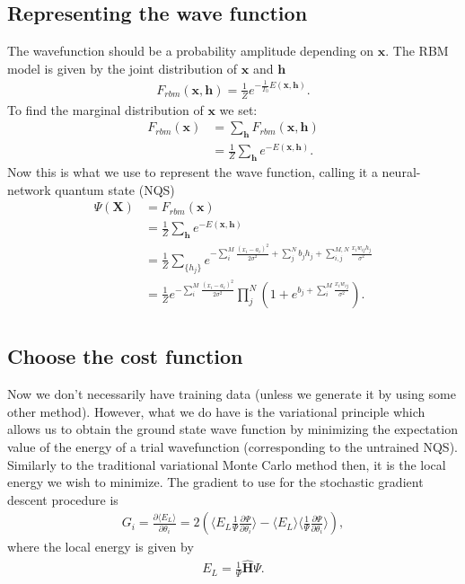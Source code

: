 \documentclass[%
oneside,                 %
final,                   %
10pt]{article}
\begin{document}
\subsection{Representing the wave function}
The wavefunction should be a probability amplitude depending on $\bm{x}$. The RBM model is given by the joint distribution of $\bm{x}$ and $\bm{h}$
\begin{align}
	F_{rbm}(\mathbf{x},\mathbf{h}) = \frac{1}{Z} e^{-\frac{1}{T_0}E(\mathbf{x},\mathbf{h})}.
\end{align}
To find the marginal distribution of $\bm{x}$ we set:
\begin{align}
	F_{rbm}(\mathbf{x}) &= \sum_\mathbf{h} F_{rbm}(\mathbf{x}, \mathbf{h}) \\
				&= \frac{1}{Z}\sum_\mathbf{h} e^{-E(\mathbf{x}, \mathbf{h})}.
\end{align}
Now this is what we use to represent the wave function, calling it a neural-network quantum state (NQS)
\begin{align}
	\Psi (\mathbf{X}) &= F_{rbm}(\mathbf{x}) \\
	&= \frac{1}{Z}\sum_{\bm{h}} e^{-E(\mathbf{x}, \mathbf{h})} \\
	&= \frac{1}{Z} \sum_{\{h_j\}} e^{-\sum_i^M \frac{(x_i - a_i)^2}{2\sigma^2} + \sum_j^N b_j h_j + \sum_{i,j}^{M,N} \frac{x_i w_{ij} h_j}{\sigma^2}} \\
	&= \frac{1}{Z} e^{-\sum_i^M \frac{(x_i - a_i)^2}{2\sigma^2}} \prod_j^N (1 + e^{b_j + \sum_i^M \frac{x_i w_{ij}}{\sigma^2}}). \\
\end{align}

\subsection{Choose the cost function}
Now we don't necessarily have training data (unless we generate it by using some other method). However, what we do have is the variational principle which allows us to obtain the ground state wave function by minimizing the expectation value of the energy of a trial wavefunction (corresponding to the untrained NQS). Similarly to the traditional variational Monte Carlo method then, it is the local energy we wish to minimize. The gradient to use for the stochastic gradient descent procedure is
\begin{align}
	G_i = \frac{\partial \langle E_L \rangle}{\partial \theta_i}
	= 2(\langle E_L \frac{1}{\Psi}\frac{\partial \Psi}{\partial \theta_i} \rangle - \langle E_L \rangle \langle \frac{1}{\Psi}\frac{\partial \Psi}{\partial \theta_i} \rangle ),
\end{align}
where the local energy is given by
\begin{align}
	E_L = \frac{1}{\Psi} \hat{\mathbf{H}} \Psi.
\end{align}
\end{document}
